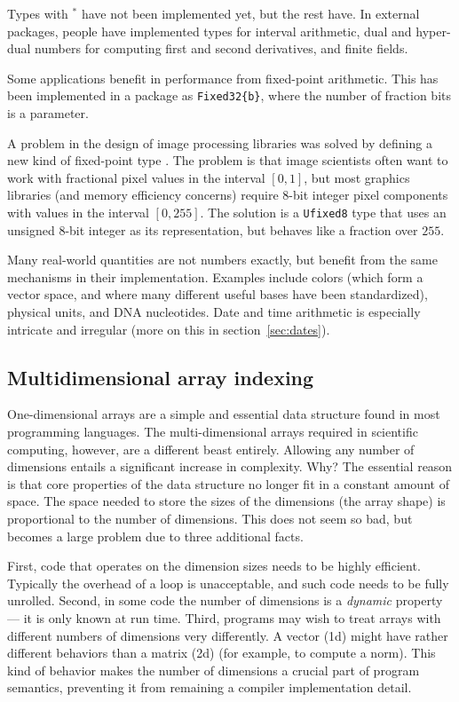\noindent
Types with $^*$ have not been implemented yet, but the rest have.
In external packages, people have implemented types for interval arithmetic,
dual and hyper-dual numbers for computing first and second derivatives,
and finite fields.

Some applications benefit in performance from fixed-point arithmetic.
This has been implemented in a package as \texttt{Fixed32\{b\}}, where
the number of fraction bits is a parameter.

A problem in the design of image processing libraries was solved by
defining a new kind of fixed-point type \cite{ufixed}. The problem
is that image scientists often want to work with fractional pixel values in the
interval $[0,1]$, but most graphics libraries (and memory
efficiency concerns) require 8-bit integer pixel components with
values in the interval $[0,255]$. The solution is a \texttt{Ufixed8}
type that uses an unsigned 8-bit integer as its representation, but
behaves like a fraction over $255$.

Many real-world quantities are not numbers exactly, but benefit from the
same mechanisms in their implementation. Examples include colors (which form
a vector space, and where many different useful bases have been standardized),
physical units, and DNA nucleotides. Date and time arithmetic is especially
intricate and irregular (more on this in section~\ref{sec:dates}).


\subsection{Multidimensional array indexing}

One-dimensional arrays are a simple and essential data structure found in
most programming languages. The multi-dimensional arrays required in
scientific computing, however, are a different beast entirely. Allowing
any number of dimensions entails a significant increase in complexity. Why?
The essential reason is that core properties of the data structure no
longer fit in a constant amount of space. The space needed to store the
sizes of the dimensions (the array shape) is proportional to the number
of dimensions. This does not seem so bad, but becomes a large problem
due to three additional facts.

First, code that operates on the dimension
sizes needs to be highly efficient. Typically the overhead of a loop is
unacceptable, and such code needs to be fully unrolled. Second, in some
code the number of dimensions is a \emph{dynamic} property --- it is
only known at run time. Third, programs may wish to treat arrays with
different numbers of dimensions very differently. A vector (1d) might
have rather different behaviors than a matrix (2d) (for example, to
compute a norm). This kind of
behavior makes the number of dimensions a crucial part of program
semantics, preventing it from remaining a compiler implementation detail.


